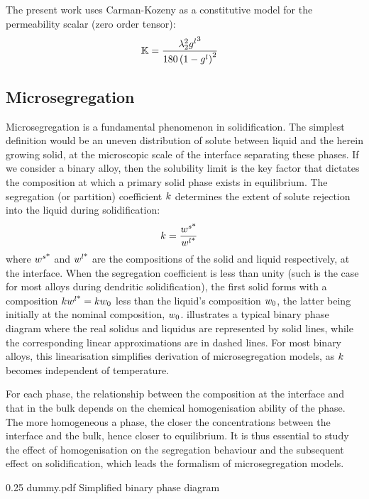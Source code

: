 The present work uses Carman-Kozeny as a constitutive model for the permeability scalar (zero order tensor):
\begin{align}
\label{eq:permeability}
& \mathbb{K}  = \frac{{\lambda}_{2}^2 {g^l}^3}{180\left( 1-{g^l} \right)^2}
\end{align}
%
%
\subsection{Microsegregation}
Microsegregation is a fundamental phenomenon in solidification. The simplest definition would be 
an uneven distribution of solute between liquid and the herein growing solid, at the microscopic scale
of the interface separating these phases. If we consider a binary alloy, then the solubility limit is 
the key factor that dictates the composition at which a primary solid phase exists in equilibrium. 
The segregation (or partition) coefficient $k$ determines the extent of solute rejection into the liquid during solidification:
\begin{align}
\label{eq:partition}
& k = \frac{{w}^{s \text{*}} }{{w}^{l \text{*}} }
\end{align}
where ${w}^{s \text{*}} $ and ${w}^{l \text{*}} $ are the compositions of the solid and liquid respectively, at the interface. When the 
segregation coefficient is less than unity (such is the case for most alloys during dendritic solidification), 
the first solid forms with a composition $k {w}^{l \text{*}} =k {w}_0$ less than the liquid's 
composition ${w}_0$, the latter being initially at the nominal composition, ${w}_0$.  illustrates a typical binary 
phase diagram where the real solidus and liquidus are represented by solid lines, while the corresponding linear approximations are in dashed lines.
For most binary alloys, this linearisation simplifies derivation of microsegregation models, as $k$ becomes independent of temperature.

For each phase, the relationship between the composition at the interface and that in the bulk depends on the chemical homogenisation ability of the phase.
The more homogeneous a phase, the closer the concentrations between the interface and the bulk, hence closer to equilibrium.
It is thus essential to study the effect of homogenisation on the segregation behaviour and the subsequent effect on solidification, which leads the formalism of microsegregation models.
\begin{figureth}
{0.25}
{dummy.pdf}
{Simplified binary phase diagram}
\label{fig:binary_diag}
\end{figureth}
%
%
